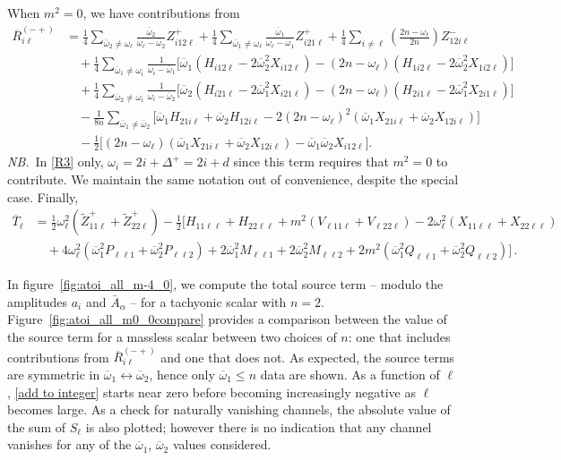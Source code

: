 \documentclass[letterpaper,11pt]{article}
\newcommand{\oi}{\omega_i}
\newcommand{\ol}{\omega_\ell}
\newcommand{\oone}{\overline{\omega}_1}
\newcommand{\otwo}{\overline{\omega}_2}
\begin{document}
When $m^2 = 0$, we have contributions from
\begin{align}
\label{R3}
\overline{R}_{i\ell}^{(-+)} &=  \frac{1}{4} \sum_{\otwo \neq \ol} \frac{\otwo}{\ol - \otwo} Z^+_{i12\ell} + \frac{1}{4} \sum_{\oone \neq \ol} \frac{\oone}{\ol - \oone} Z^+_{i21\ell} + \frac{1}{4} \sum_{i \neq \ell} \left( \frac{2n - \ol}{2n} \right) Z^-_{12i\ell} \nonumber \\
%
& \quad + \frac{1}{4} \sum_{\oone \neq \oi} \frac{1}{\oi - \oone} \Big[ \oone \left( H_{i12\ell} - 2\otwo^2 X_{i12\ell} \right) - (2n - \ol) \left( H_{1i2\ell} - 2\otwo^2 X_{1i2\ell} \right) \Big] \nonumber \\
%
& \quad + \frac{1}{4} \sum_{\otwo \neq \oi} \frac{1}{\oi - \otwo} \Big[ \otwo \left( H_{i21\ell} - 2\oone^2 X_{i21\ell} \right) - (2n - \ol) \left( H_{2i1\ell} - 2\oone^2 X_{2i1\ell} \right) \Big] \nonumber \\
%
& \quad - \frac{1}{8n} \sum_{\oone \neq \otwo} \Big[ \oone H_{21i\ell} + \otwo H_{12i\ell} - 2 \left( 2n - \ol \right)^2 \left(\oone X_{21i\ell} + \otwo X_{12i\ell} \right) \Big] \nonumber \\
%
& \quad - \frac{1}{2} \Big[ (2n - \ol) \left( \oone X_{21i\ell} + \otwo X_{12i\ell} \right) - \oone \otwo X_{i12\ell} \Big] .
\end{align}
{\it NB.}\, In \eqref{R3} only, $\oi = 2i + \Delta^+ = 2i + d$ since this term requires that $m^2 = 0$ to contribute. We maintain the same notation out of convenience, despite the special case. Finally, 
\begin{align}
\label{T12}
\overline{T}_{\ell} &=  \frac{1}{2} \ol^2 \left( \tilde{Z}^+_{11\ell} + \tilde{Z}^+_{22\ell} \right)- \frac{1}{2} \Big[ H_{11\ell\ell} + H_{22\ell\ell} + m^2 \left( V_{\ell 1 1 \ell} + V_{\ell 2 2 \ell} \right) - 2 \ol^2 \left( X_{11\ell\ell} + X_{22\ell\ell} \right)  \nonumber \\
%
& \quad + 4 \ol^2 \left( \oone^2 P_{\ell \ell 1} + \otwo^2 P_{\ell \ell 2} \right) + 2\oone^2 M_{\ell \ell 1} + 2\otwo^2 M_{\ell \ell 2} + 2m^2 \left( \oone^2 Q_{\ell\ell 1} + \otwo^2 Q_{\ell \ell 2} \right) \Big] \, .
\end{align}

In figure~\ref{fig:atoi_all_m-4_0}, we compute the total source term -- modulo the amplitudes $a_i$ and $\bar A_\alpha$ -- for a tachyonic scalar with $n = 2$. Figure~\ref{fig:atoi_all_m0_0compare} provides a comparison between the value of the source term for a massless scalar between two choices of $n$: one that includes contributions from $\overline{R}_{i\ell}^{(-+)}$ and one that does not. As expected, the source terms are symmetric in $\oone \leftrightarrow \otwo$, hence only $\oone \leq n$ data are shown. As a function of $\ell$, \eqref{add to integer} starts near zero before becoming increasingly negative as $\ell$ becomes large. As a check for naturally vanishing channels, the absolute value of the sum of $S_\ell$ is also plotted; however there is no indication that any channel vanishes for any of the $\oone$, $\otwo$ values considered. 
\end{document}
